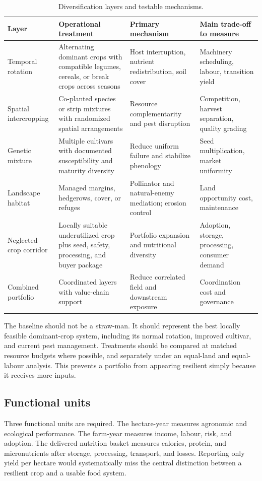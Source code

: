 \documentclass[conference]{IEEEtran}
\begin{document}
\begin{table}[t]
\centering
\caption{Diversification layers and testable mechanisms.}
\label{tab:layers}
\setlength{\tabcolsep}{3pt}
\begin{tabular}{>{\raggedright\arraybackslash}p{}>{\raggedright\arraybackslash}p{}>{\raggedright\arraybackslash}p{}>{\raggedright\arraybackslash}p{}}
\toprule
Layer & Operational treatment & Primary mechanism & Main trade-off to measure\\
\midrule
Temporal rotation & Alternating dominant crops with compatible legumes, cereals, or break crops across seasons & Host interruption, nutrient redistribution, soil cover & Machinery scheduling, labour, transition yield\\
Spatial intercropping & Co-planted species or strip mixtures with randomized spatial arrangements & Resource complementarity and pest disruption & Competition, harvest separation, quality grading\\
Genetic mixture & Multiple cultivars with documented susceptibility and maturity diversity & Reduce uniform failure and stabilize phenology & Seed multiplication, market uniformity\\
Landscape habitat & Managed margins, hedgerows, cover, or refuges & Pollinator and natural-enemy mediation; erosion control & Land opportunity cost, maintenance\\
Neglected-crop corridor & Locally suitable underutilized crop plus seed, safety, processing, and buyer package & Portfolio expansion and nutritional diversity & Adoption, storage, processing, consumer demand\\
Combined portfolio & Coordinated layers with value-chain support & Reduce correlated field and downstream exposure & Coordination cost and governance\\
\bottomrule
\end{tabular}
\end{table}

The baseline should not be a straw-man. It should represent the best locally feasible dominant-crop system, including its normal rotation, improved cultivar, and current pest management. Treatments should be compared at matched resource budgets where possible, and separately under an equal-land and equal-labour analysis. This prevents a portfolio from appearing resilient simply because it receives more inputs.

\subsection{Functional units}
Three functional units are required. The hectare-year measures agronomic and ecological performance. The farm-year measures income, labour, risk, and adoption. The delivered nutrition basket measures calories, protein, and micronutrients after storage, processing, transport, and losses. Reporting only yield per hectare would systematically miss the central distinction between a resilient crop and a usable food system.
\end{document}

